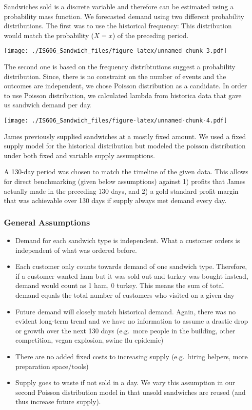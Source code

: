 \documentclass[]{article}
\begin{document}
Sandwiches sold is a discrete variable and therefore can be estimated
using a probability mass function. We forecasted demand using two
different probability distributions. The first was to use the historical
frequency: This distribution would match the probability ($X=x$) of the
preceding period.

\texttt{[image: ./IS606\_Sandwich\_files/figure-latex/unnamed-chunk-3.pdf]}

The second one is based on the frequency distribtutions suggest a
probability distribution. Since, there is no constraint on the number of
events and the outcomes are independent, we chose Poisson distribution
as a candidate. In order to use Poisson distribution, we calculated
lambda from historica data that gave us sandwich demand per day.

\texttt{[image: ./IS606\_Sandwich\_files/figure-latex/unnamed-chunk-4.pdf]}

James previously supplied sandwiches at a mostly fixed amount. We used a
fixed supply model for the historical distribution but modeled the
poisson distribution under both fixed and variable supply assumptions.

A 130-day period was chosen to match the timeline of the given data.
This allows for direct benchmarking (given below assumptions) against 1)
profits that James actually made in the preceding 130 days, and 2) a
gold standard profit margin that was achievable over 130 days if supply
always met demand every day.

\subsubsection{General Assumptions}\label{general-assumptions}

\begin{itemize}
\itemsep1pt\parskip0pt
\item
  Demand for each sandwich type is independent. What a customer orders
  is independent of what was ordered before.
\item
  Each customer only counts towards demand of one sandwich type.
  Therefore, if a customer wanted ham but it was sold out and turkey was
  bought instead, demand would count as 1 ham, 0 turkey. This means the
  sum of total demand equals the total number of customers who visited
  on a given day
\item
  Future demand will closely match historical demand. Again, there was
  no evident long-term trend and we have no information to assume a
  drastic drop or growth over the next 130 days (e.g.~more people in the
  building, other competition, vegan explosion, swine flu epidemic)
\item
  There are no added fixed costs to increasing supply (e.g.~hiring
  helpers, more preparation space/tools)
\item
  Supply goes to waste if not sold in a day. We vary this assumption in
  our second Poisson distribution model in that unsold sandwiches are
  reused (and thus increase future supply).
\end{itemize}
\end{document}
